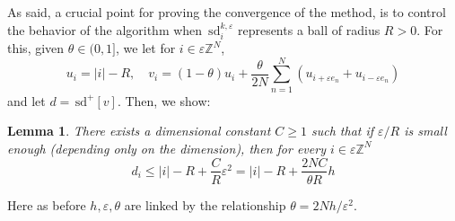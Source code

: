 \documentclass[10pt]{amsart}
\theoremstyle{plain}
\newtheorem{lemma}[theorem]{Lemma}
\theoremstyle{definition}
\newcommand{\Z}{\mathbb{Z}}
\newcommand{\e}{\varepsilon}
\newcommand{\sd}{\,\mathrm{sd}}
\newcommand{\ez}{\e\Z^N}
\numberwithin{equation}{section}
\begin{document}
As said, a crucial point for proving the convergence of the method, is to control the behavior
of the algorithm when $\sd^{k,\e}_i$ represents a ball of radius $R>0$. For this,
given $\theta\in  {(0,1]}$, we let for $i\in\ez$,
\begin{equation}\label{eq:v}
    u_i= |i|-R,\quad v_i = (1-\theta) u_i + \frac{\theta}{2N} \sum_{n=1}^N (u_{i+\e e_n}+u_{i-\e e_n})   
\end{equation}
and let $d=\sd^+[v]$. Then, we show:
\begin{lemma}\label{lem:balls}
  There exists a dimensional constant $C\ge 1$ such that if $\e/R$ is small enough (depending
  only on the dimension), then for every $i\in\ez$
  \[
    d_i \le |i|-R + \frac{C}{R}\e^2 = |i|-R + \frac{2NC}{\theta R}h  
  \]
\end{lemma}
\noindent Here as before $h,\e,\theta$ are linked by the relationship $\theta=2Nh/\e^2$.
\end{document}
